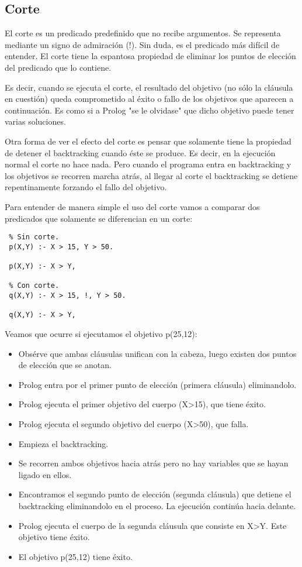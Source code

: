 \documentclass[11pt]{article}
\begin{document}
\subsection*{Corte}
\label{sec:orga5e8ec5}

El corte es un predicado predefinido que no recibe argumentos. Se
representa mediante un signo de admiración (!). Sin duda, es el
predicado más difícil de entender. El corte tiene la espantosa
propiedad de eliminar los puntos de elección del predicado que lo
contiene.

Es decir, cuando se ejecuta el corte, el resultado del objetivo (no
sólo la cláusula en cuestión) queda comprometido al éxito o fallo de
los objetivos que aparecen a continuación. Es como si a Prolog "se le
olvidase" que dicho objetivo puede tener varias soluciones.

Otra forma de ver el efecto del corte es pensar que solamente tiene la
propiedad de detener el backtracking cuando éste se produce. Es decir,
en la ejecución normal el corte no hace nada. Pero cuando el programa
entra en backtracking y los objetivos se recorren marcha atrás, al
llegar al corte el backtracking se detiene repentinamente forzando el
fallo del objetivo.



Para entender de manera simple el uso del corte vamos a comparar dos
predicados que solamente se diferencian en un corte:


\begin{verbatim}
 % Sin corte. 
 p(X,Y) :- X > 15, Y > 50. 
 
 p(X,Y) :- X > Y, 

 % Con corte.
 q(X,Y) :- X > 15, !, Y > 50. 
 
 q(X,Y) :- X > Y, 

\end{verbatim}


Veamos que ocurre si ejecutamos el objetivo p(25,12):

\begin{itemize}
\item Obsérve que ambas cláusulas unifican con la cabeza, luego existen
dos puntos de elección que se anotan.
\item Prolog entra por el primer punto de elección (primera cláusula)
eliminandolo.
\item Prolog ejecuta el primer objetivo del cuerpo (X>15), que tiene
éxito.
\item Prolog ejecuta el segundo objetivo del cuerpo (X>50), que falla.
\item Empieza el backtracking.
\item Se recorren ambos objetivos hacia atrás pero no hay variables que se
hayan ligado en ellos.
\item Encontramos el segundo punto de elección (segunda cláusula) que
detiene el backtracking eliminandolo en el proceso. La ejecución
continúa hacia delante.
\item Prolog ejecuta el cuerpo de la segunda cláusula que consiste en
X>Y. Este objetivo tiene éxito.
\item El objetivo p(25,12) tiene éxito.
\end{itemize}
\end{document}
